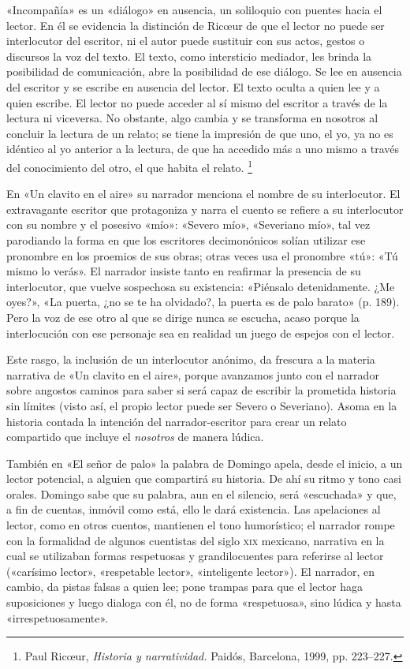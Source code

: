 \documentclass[14pt,twoside,final]{extbook} %
\let\oldfootnote\footnote
\renewcommand\footnote[1]{%
\oldfootnote{\hspace{1mm}#1}}
\begin{document}
«Incompañía» es un «diálogo» en ausencia, un soliloquio con puentes hacia el lector. En él se evidencia la distinción de Ric\oe ur de que el lector no puede ser interlocutor del escritor, ni el autor puede sustituir con sus actos, gestos o discursos la voz del texto. El texto, como intersticio mediador, les brinda la posibilidad de comunicación, abre la posibilidad de ese diálogo. Se lee en ausencia del escritor y se escribe en ausencia del lector. El texto oculta a quien lee y a quien escribe. El lector no puede acceder al sí mismo del escritor a través de la lectura ni viceversa. No obstante, algo cambia y se transforma en nosotros al concluir la lectura de un relato; se tiene la impresión de que uno, el yo, ya no es idéntico al yo anterior a la lectura, de que ha accedido más a uno mismo a través del conocimiento del otro, el que habita el relato.\footnote{Paul Ric\oe ur, \emph{Historia y narratividad.} Paidós, Barcelona, 1999, pp. 223--227.}

En «Un clavito en el aire» su narrador menciona el nombre de su interlocutor. El extravagante escritor que protagoniza y narra el cuento se refiere a su interlocutor con su nombre y el posesivo «mío»: «Severo mío», «Severiano mío», tal vez parodiando la forma en que los escritores decimonónicos solían utilizar ese pronombre en los proemios de sus obras; otras veces usa el pronombre «tú»: «Tú mismo lo verás». El narrador insiste tanto en reafirmar la presencia de su interlocutor, que vuelve sospechosa su existencia: «Piénsalo detenidamente. ¿Me oyes?», «La puerta, ¿no se te ha olvidado?, la puerta es de palo barato» (p. 189). Pero la voz de ese otro al que se dirige nunca se escucha, acaso porque la interlocución con ese personaje sea en realidad un juego de espejos con el lector.

Este rasgo, la inclusión de un interlocutor anónimo, da frescura a la materia narrativa de «Un clavito en el aire», porque avanzamos junto con el narrador sobre angostos caminos para saber si será capaz de escribir la prometida historia sin límites (visto así, el propio lector puede ser Severo o Severiano). Asoma en la historia contada la intención del narrador-escritor para crear un relato compartido que incluye el \emph{nosotros} de manera lúdica.

También en «El señor de palo» la palabra de Domingo apela, desde el inicio, a un lector potencial, a alguien que compartirá su historia. De ahí su ritmo y tono casi orales. Domingo sabe que su palabra, aun en el silencio, será «escuchada» y que, a fin de cuentas, inmóvil como está, ello le dará existencia. Las apelaciones al lector, como en otros cuentos, mantienen el tono humorístico; el narrador rompe con la formalidad de algunos cuentistas del siglo \textsc{xix} mexicano, narrativa en la cual se utilizaban formas respetuosas y grandilocuentes para referirse al lector («carísimo lector», «respetable lector», «inteligente lector»). El narrador, en cambio, da pistas falsas a quien lee; pone trampas para que el lector haga suposiciones y luego dialoga con él, no de forma «respetuosa», sino lúdica y hasta «irrespetuosamente».
\end{document}
